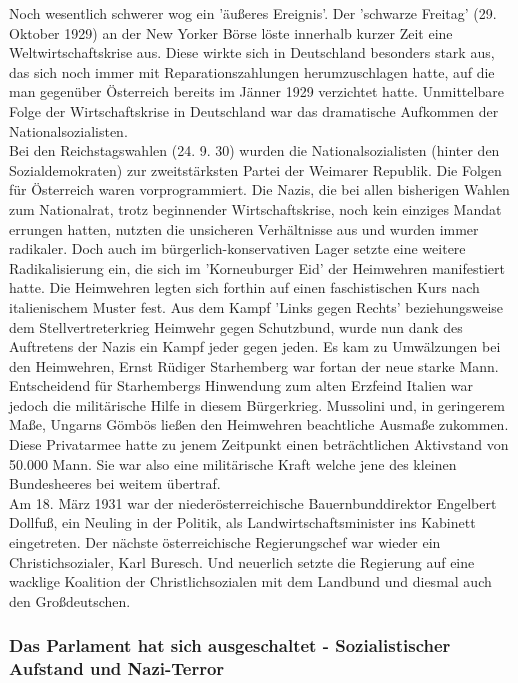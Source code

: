 \documentclass[letterpaper, 12pt]{article}
\let\tempsubsubsection\subsubsection
\renewcommand\subsubsection[1]{\vspace{0cm}\tempsubsubsection{#1}\vspace{0cm}}
\begin{document}
Noch wesentlich schwerer wog ein 'äußeres Ereignis'. Der 'schwarze Freitag' (29. Oktober 1929) an der New Yorker Börse löste innerhalb kurzer Zeit eine Weltwirtschaftskrise aus. Diese wirkte sich in Deutschland besonders stark aus, das sich noch immer mit Reparationszahlungen herumzuschlagen hatte, auf die man gegenüber Österreich bereits im Jänner 1929 verzichtet hatte. Unmittelbare Folge der Wirtschaftskrise in Deutschland war das dramatische Aufkommen der Nationalsozialisten. \\ Bei den Reichstagswahlen (24. 9. 30) wurden die Nationalsozialisten (hinter den Sozialdemokraten) zur zweitstärksten Partei der Weimarer Republik. Die Folgen für Österreich waren vorprogrammiert. Die Nazis, die bei allen bisherigen Wahlen zum Nationalrat, trotz beginnender Wirtschaftskrise, noch kein einziges Mandat errungen hatten, nutzten die unsicheren Verhältnisse aus und wurden immer radikaler. Doch auch im bürgerlich-konservativen Lager setzte eine weitere Radikalisierung ein, die sich im 'Korneuburger Eid' der Heimwehren manifestiert hatte. Die Heimwehren legten sich forthin auf einen faschistischen Kurs nach italienischem Muster fest. Aus dem Kampf 'Links gegen Rechts' beziehungsweise dem Stellvertreterkrieg Heimwehr gegen Schutzbund, wurde nun dank des Auftretens der Nazis ein Kampf jeder gegen jeden. Es kam zu Umwälzungen bei den Heimwehren, Ernst Rüdiger Starhemberg war fortan der neue starke Mann. \\ Entscheidend für Starhembergs Hinwendung zum alten Erzfeind Italien war jedoch die militärische Hilfe in diesem Bürgerkrieg. Mussolini und, in geringerem Maße, Ungarns Gömbös ließen den Heimwehren beachtliche Ausmaße zukommen. Diese Privatarmee hatte zu jenem Zeitpunkt einen beträchtlichen Aktivstand von 50.000 Mann. Sie war also eine militärische Kraft welche jene des kleinen Bundesheeres bei weitem übertraf. \\
Am 18. März 1931 war der niederösterreichische Bauernbunddirektor Engelbert Dollfuß, ein Neuling in der Politik, als Landwirtschaftsminister ins Kabinett eingetreten. Der nächste österreichische Regierungschef war wieder ein Christichsozialer, Karl Buresch. Und neuerlich setzte die Regierung auf eine wacklige Koalition der Christlichsozialen mit dem Landbund und diesmal auch den Großdeutschen.

\subsubsection{Das Parlament hat sich ausgeschaltet - Sozialistischer Aufstand und Nazi-Terror}
\end{document}
